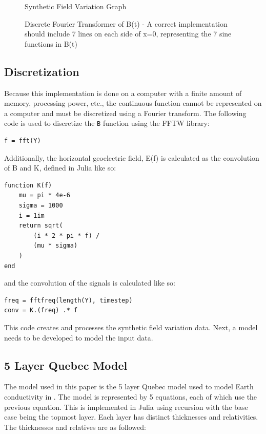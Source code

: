 \documentclass[10pt,a4paper,twoside]{article}
\begin{document}
\begin{multicols}{2}
\begin{figure}[b!]
		\caption{Synthetic Field Variation Graph}
		\caption{Discrete Fourier Transformer of B(t) - A correct implementation should include 7 lines on each side of x=0, representing the 7 sine functions in B(t)}
	\end{figure}
		
		
	\subsection{Discretization}
	\label{discretization}
	
	Because this implementation is done on a computer with a finite amount of memory, processing power, etc., the continuous function cannot be represented on a computer and must be discretized using a Fourier transform. The following code is used to discretize the \verb|B| function using the FFTW library:
	\begin{lstlisting}
f = fft(Y)
	\end{lstlisting}

    
    Additionally, the horizontal geoelectric field, E(f) is calculated as the convolution of B and K, defined in Julia like so:
    
    \begin{lstlisting}
function K(f)
    mu = pi * 4e-6
    sigma = 1000
    i = 1im
    return sqrt(
        (i * 2 * pi * f) /
        (mu * sigma)
    )
end
    \end{lstlisting}
    
    and the convolution of the signals is calculated like so:
    
    \begin{lstlisting}
freq = fftfreq(length(Y), timestep)
conv = K.(freq) .* f
    \end{lstlisting}
    
    This code creates and processes the synthetic field variation data. Next, a model needs to be developed to model the input data.
    
    
    \subsection{5 Layer Quebec Model}
    The model used in this paper is the 5 layer Quebec model used to model Earth conductivity in \cite{8859181}. The model is represented by 5 equations, each of which use the previous equation. This is implemented in Julia using recursion with the base case being the topmost layer. Each layer has distinct thicknesses and relativities. The thicknesses and relatives are as followed:
    \\
    

\end{multicols}
\end{document}
